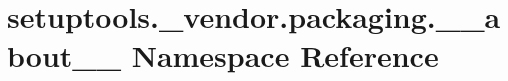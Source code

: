\hypertarget{namespacesetuptools_1_1__vendor_1_1packaging_1_1____about____}{}\section{setuptools.\+\_\+vendor.\+packaging.\+\_\+\+\_\+about\+\_\+\+\_\+ Namespace Reference}
\label{namespacesetuptools_1_1__vendor_1_1packaging_1_1____about____}
